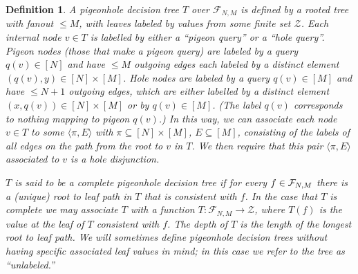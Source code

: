 \documentclass[11pt]{article}
\newtheorem{definition}{Definition}
\newcommand{\todo}[1]{\textcolor{red}{TODO: #1}}
\begin{document}
\begin{definition}
A pigeonhole decision tree $T$ over $\mathcal{F}_{N,M}$ is defined by a rooted tree with fanout $\leq M$, with leaves labeled by values from some finite set $\mathcal{Z}$. Each internal node $v \in T$ is labelled by either a ``pigeon query'' or a ``hole query''.  Pigeon nodes (those that make a pigeon query) are labeled by a query $q(v) \in [N]$ and have $\leq M$ outgoing edges each labeled by a distinct element $(q(v), y) \in [N] \times [M]$. 
Hole nodes are labeled by a query $q(v) \in [M]$ and have $\leq N+1$ outgoing edges, which are either labelled by a  distinct element $(x,q(v)) \in [N] \times [M]$ or by $q(v) \in [M]$. (The label $q(v)$ corresponds to nothing mapping to pigeon $q(v)$.)  
In this way, we can associate each node $v \in T$ to some $\langle \pi, E\rangle$ with $\pi \subseteq [N] \times [M]$, $E \subseteq [M]$, consisting of the labels of all edges on the path from the root to $v$ in $T$. We then require that this pair $\langle \pi, E\rangle$ associated to $v$ is a hole disjunction.

$T$ is said to be a complete pigeonhole decision tree if for every $f \in {\cal F}_{N,M}$ there is a (unique) root to leaf path in $T$ that is consistent with $f$. In the case that $T$ is complete we may associate $T$ with a function $T: \mathcal{F}_{N,M} \to \mathcal{Z}$, where $T(f)$ is the value at the leaf of $T$ consistent with $f$.
The depth of $T$ is the length of the longest root to leaf path. We will sometimes define pigeonhole decision trees without having specific associated leaf values in mind; in this case we refer to the tree as ``unlabeled.''




\end{definition}
\end{document}
